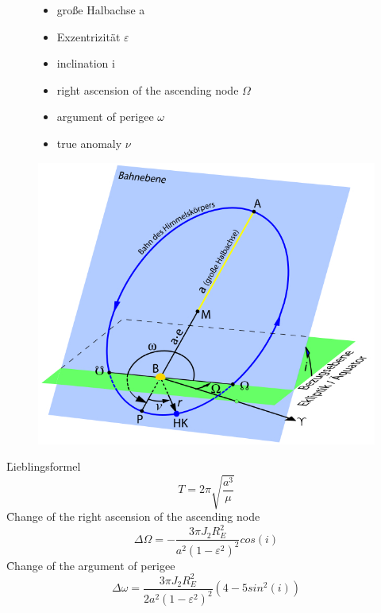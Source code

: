 \begin{figure}[!ht]
\begin{minipage}{0.35\textwidth}
 \begin{itemize}
  \item große Halbachse a
  \item Exzentrizität $\varepsilon$
  \item inclination i
  \item right ascension of the ascending node $\Omega$
  \item argument of perigee $\omega$
  \item true anomaly $\nu$
 \end{itemize} 
\end{minipage}
\hfill
\begin{minipage}{0.64\textwidth}
  \centering
  \includegraphics[scale=0.55]{BahnelementeEllipse}
\end{minipage}
\end{figure}
\noindent \f{Lieblingsformel}
\[T = 2\pi\sqrt{\frac{a^3}{\mu}}\]
\f{Change of the right ascension of the ascending node}
\[\Delta \Omega = - \frac{3\pi J_2R_E^2}{a^2(1-\varepsilon^2)^2}cos(i)\]
\f{Change of the argument of perigee}
\[\Delta \omega = \frac{3\pi J_2R_E^2}{2a^2(1-\varepsilon^2)^2}(4-5sin^2(i))\]

